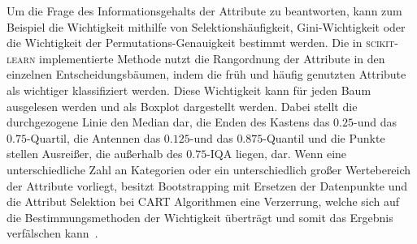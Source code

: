 Um die Frage des Informationsgehalts der Attribute zu beantworten, kann zum Beispiel die Wichtigkeit mithilfe von Selektionshäufigkeit, Gini-Wichtigkeit oder
die Wichtigkeit der Permutations-Genauigkeit bestimmt werden.
Die in \textsc{scikit-learn} implementierte Methode nutzt die Rangordnung der Attribute in den einzelnen Entscheidungsbäumen, indem die früh und häufig genutzten Attribute
als wichtiger klassifiziert werden\cite{sklearn_FI}.
Diese Wichtigkeit kann für jeden Baum ausgelesen werden und als Boxplot dargestellt werden.
Dabei stellt die durchgezogene Linie den Median dar, die Enden des Kastens das $\num{0.25}$-und das $\num{0.75}$-Quartil, die Antennen das $\num{0.125}$-und das
$\num{0.875}$-Quantil und die Punkte stellen Ausreißer, die außerhalb des $\num{0.75}$-IQA liegen, dar.
Wenn eine unterschiedliche Zahl an Kategorien oder ein unterschiedlich großer Wertebereich der Attribute vorliegt, besitzt Bootstrapping mit Ersetzen der Datenpunkte
und die Attribut Selektion bei CART Algorithmen eine Verzerrung, welche sich auf die Bestimmungsmethoden der Wichtigkeit überträgt und somit das Ergebnis verfälschen
kann~\cite{feature_importance}.
